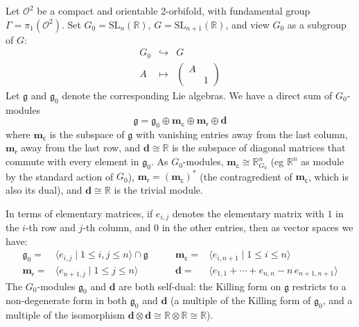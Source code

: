 \documentclass[a4paper,11pt]{article}
\begin{document}
Let $\mathcal O^2$ be a compact and orientable 2-orbifold, 
with fundamental group
$\Gamma=\pi_1(\mathcal O^2)$. Set
$ G_0=\mathrm{SL}_{n}(\mathbb R)$,
$G=\mathrm{SL}_{n+1}(\mathbb R)$, and view $G_0$ as a subgroup of $G$:
$$
\begin{array}{rcl}
 G_0 & \hookrightarrow & G\\
 A & \mapsto &\begin{pmatrix}
               A & \\ & 1
              \end{pmatrix}
\end{array}
$$
Let $\mathfrak g$ and $\mathfrak g_0$ denote the corresponding Lie algebras. We have a direct sum of 
$G_0$-modules
\begin{equation}
\label{eqn:directsum}
\mathfrak g= \mathfrak g_0\oplus \mathbf m_{\mathsf c}\oplus
\mathbf m_{\mathsf r}\oplus \mathbf d
\end{equation}
where  $\mathbf m_{\mathsf c}$ is the subspace of $\mathfrak g$
with vanishing entries away from the last column, 
$\mathbf m_{\mathsf r}$ away from the last row, and 
 $\mathbf d\cong \mathbb R$ is the subspace of diagonal matrices 
 that commute with every element in $\mathfrak g_0$. 
As $G_0$-modules, 
  $\mathbf m_{\mathsf c}\cong \mathbb R^n_{G_0}$ (eg  $\mathbb R^n$ as  module 
by the standard action of $G_ 0$),
$\mathbf m_{\mathsf r}= (\mathbf m_{\mathsf c})^*$  (the  contragredient of $\mathbf m_{\mathsf c}$,
which is also its dual),
and $\mathbf d\cong \mathbb R$ is the trivial module.



In terms of elementary matrices, if $e_{i,j}$ denotes  the elementary matrix with $1$ in the $i$-th row and $j$-th column, and 0 in the other entries, then as vector spaces we have:
\[
\begin{aligned}
 \mathfrak g_{0}=& \langle e_{i,j}\mid 1\leq i,j\leq n
 \rangle\cap\mathfrak g \\
 \mathbf m_{\mathsf r} = & \langle e_{{n+1}, j}\mid 1\leq j\leq n
  \rangle 
  \end{aligned}
 \qquad
\begin{aligned}
 \mathbf m_{\mathsf c} = & \langle e_{i,{n+1}}\mid 1\leq i\leq n
 \rangle 
\\
   \mathbf d = & \langle e_{1,1}+\cdots +e_{n,n}- 
 n \,e_{n+1,n+1}\rangle 
\end{aligned}
\] 
The $G_0$-modules $\mathfrak g_0$ and $\mathbf d$ are both self-dual: the Killing form on $\mathfrak g$ restricts
to a non-degenerate form in both $\mathfrak g_0$ and $\mathbf d$  (a multiple of the Killing form of 
$\mathfrak g_0$, and a multiple of the isomorphism 
$\mathbf d\otimes \mathbf d\cong \mathbb R\otimes \mathbb R\cong \mathbb R$).
\end{document}
